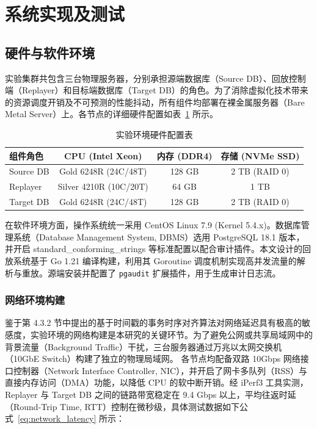 \newpage
\setcounter{table}{0}
\setcounter{figure}{0}
\section{系统实现及测试}

\subsection{硬件与软件环境}
\label{subsec:hardware_software}

实验集群共包含三台物理服务器，分别承担源端数据库（Source DB）、回放控制端（Replayer）和目标端数据库（Target DB）的角色。为了消除虚拟化技术带来的资源调度开销及不可预测的性能抖动，所有组件均部署在裸金属服务器（Bare Metal Server）上。各节点的详细硬件配置如表~\ref{tab:hardware_config} 所示。

\begin{table}[htbp]
    \centering
    \caption{实验环境硬件配置表}
    \label{tab:hardware_config}
    \renewcommand{\arraystretch}{1.2}
    \begin{tabular}{lccc}
        \toprule
        \textbf{组件角色} & \textbf{CPU (Intel Xeon)} & \textbf{内存 (DDR4)} & \textbf{存储 (NVMe SSD)} \\
        \midrule
        Source DB  & Gold 6248R (24C/48T) & 128 GB & 2 TB (RAID 0) \\
        Replayer  & Silver 4210R (10C/20T) & 64 GB & 1 TB \\
        Target DB  & Gold 6248R (24C/48T) & 128 GB & 2 TB (RAID 0) \\
        \bottomrule
    \end{tabular}
\end{table}

在软件环境方面，操作系统统一采用 CentOS Linux 7.9 (Kernel 5.4.x)。数据库管理系统（Database Management System, DBMS）选用 PostgreSQL 18.1 版本，并开启 standard\_conforming\_strings 等标准配置以配合审计插件。本文设计的回放系统基于 Go 1.21 编译构建，利用其 Goroutine 调度机制实现高并发流量的解析与重放。源端安装并配置了 \texttt{pgaudit} 扩展插件，用于生成审计日志流。

\subsubsection{网络环境构建}

鉴于第 4.3.2 节中提出的基于时间戳的事务时序对齐算法对网络延迟具有极高的敏感度，实验环境的网络构建是本研究的关键环节。为了避免公网或共享局域网中的背景流量（Background Traffic）干扰，三台服务器通过万兆以太网交换机（10GbE Switch）构建了独立的物理局域网。
各节点均配备双路 10Gbps 网络接口控制器（Network Interface Controller, NIC），并开启了网卡多队列（RSS）与直接内存访问（DMA）功能，以降低 CPU 的软中断开销。经 iPerf3 工具实测，Replayer 与 Target DB 之间的链路带宽稳定在 9.4 Gbps 以上，平均往返时延（Round-Trip Time, RTT）控制在微秒级，具体测试数据如下公式~\ref{eq:network_latency} 所示：

